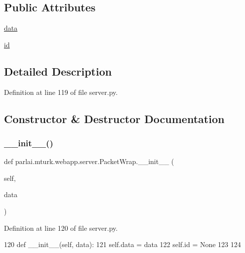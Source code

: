 \subsection*{Public Attributes}
\begin{DoxyCompactItemize}
\item 
\hyperlink{classparlai_1_1mturk_1_1webapp_1_1server_1_1PacketWrap_af3f249f0c13cb902b511ed12adb5f30c}{data}
\item 
\hyperlink{classparlai_1_1mturk_1_1webapp_1_1server_1_1PacketWrap_a588c6f6a5e15b3eb32e497483d22e7e3}{id}
\end{DoxyCompactItemize}


\subsection{Detailed Description}


Definition at line 119 of file server.\+py.



\subsection{Constructor \& Destructor Documentation}
\mbox{\label{classparlai_1_1mturk_1_1webapp_1_1server_1_1PacketWrap_af77cc3a7250c4efafafbf382753b834d}} 
\subsubsection{\texorpdfstring{\+\_\+\+\_\+init\+\_\+\+\_\+()}{\_\_init\_\_()}}
{\footnotesize\ttfamily def parlai.\+mturk.\+webapp.\+server.\+Packet\+Wrap.\+\_\+\+\_\+init\+\_\+\+\_\+ (\begin{DoxyParamCaption}\item[{}]{self,  }\item[{}]{data }\end{DoxyParamCaption})}



Definition at line 120 of file server.\+py.


\begin{DoxyCode}
120     \textcolor{keyword}{def }\_\_init\_\_(self, data):
121         self.data = data
122         self.id = \textcolor{keywordtype}{None}
123 
124 
\end{DoxyCode}


